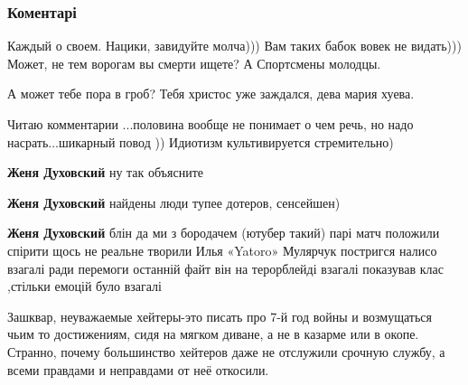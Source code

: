  
 
 
 
 

\clearpage
\subsubsection{Коментарі}
\label{sec:17_10_2021.fb.federacia_kibersporta_ukrainy.1.team_spirit.cmt}

\begin{itemize} %

Каждый о своем. Нацики, завидуйте молча))) Вам таких бабок вовек не видать)))
Может, не тем ворогам вы смерти ищете? А Спортсмены молодцы.

\begin{itemize} %
А может тебе пора в гроб? Тебя христос уже заждался, дева мария хуева.
\end{itemize} %


Читаю комментарии ...половина вообще не понимает о чем речь, но надо
насрать...шикарный повод )) Идиотизм культивируется стремительно)

\begin{itemize} %
\textbf{Женя Духовский} ну так объясните


\textbf{Женя Духовский} найдены люди тупее дотеров, сенсейшен)

\textbf{Женя Духовский} блін да ми з бородачем (ютубер такий) парі матч положили спірити щось не реальне творили Илья «Yatoro» Мулярчук постригся налисо взагалі ради перемоги останній файт він на терорблейді взагалі показував клас ,стільки емоцій було взагалі
\end{itemize} %


Зашквар, неуважаемые хейтеры-это писать про 7-й год войны и возмущаться чьим то
достижениям, сидя на мягком диване, а не в казарме или в окопе. Странно, почему
большинство хейтеров даже не отслужили срочную службу, а всеми правдами и
неправдами от неё откосили.


\end{itemize}
